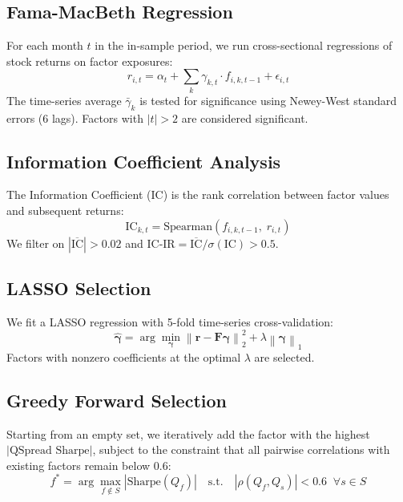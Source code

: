 \documentclass[12pt,a4paper]{article}
\begin{document}
\subsection{Fama-MacBeth Regression}

For each month $t$ in the in-sample period, we run cross-sectional regressions of stock returns on factor exposures:
\begin{equation}
    r_{i,t} = \alpha_t + \sum_{k} \gamma_{k,t} \cdot f_{i,k,t-1} + \epsilon_{i,t}
\end{equation}
The time-series average $\bar{\gamma}_k$ is tested for significance using Newey-West standard errors (6 lags). Factors with $|t| > 2$ are considered significant.

\subsection{Information Coefficient Analysis}

The Information Coefficient (IC) is the rank correlation between factor values and subsequent returns:
\begin{equation}
    \text{IC}_{k,t} = \text{Spearman}\!\left(f_{i,k,t-1},\; r_{i,t}\right)
\end{equation}
We filter on $|\overline{\text{IC}}| > 0.02$ and $\text{IC-IR} = \overline{\text{IC}} / \sigma(\text{IC}) > 0.5$.

\subsection{LASSO Selection}

We fit a LASSO regression with 5-fold time-series cross-validation:
\begin{equation}
    \hat{\boldsymbol{\gamma}} = \arg\min_{\boldsymbol{\gamma}} \left\| \mathbf{r} - \mathbf{F}\boldsymbol{\gamma} \right\|_2^2 + \lambda \left\| \boldsymbol{\gamma} \right\|_1
\end{equation}
Factors with nonzero coefficients at the optimal $\lambda$ are selected.

\subsection{Greedy Forward Selection}

Starting from an empty set, we iteratively add the factor with the highest $|\text{QSpread Sharpe}|$, subject to the constraint that all pairwise correlations with existing factors remain below 0.6:
\begin{equation}
    f^* = \arg\max_{f \notin S} \left| \text{Sharpe}(Q_f) \right| \quad \text{s.t.} \quad |\rho(Q_f, Q_s)| < 0.6 \;\; \forall s \in S
\end{equation}
\end{document}
